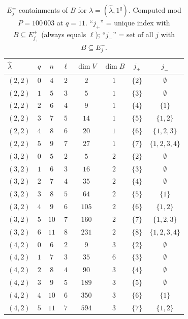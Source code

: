 \documentclass[11pt]{article}
\theoremstyle{definition}
\newcommand{\hatl}{\widehat\lambda}
\begin{document}
\begin{table}[h]
\centering
\renewcommand{\arraystretch}{1.15}
\caption{$E_j^\pm$ containments of $B$ for $\lambda = (\hatl, 1^q)$.
Computed mod $P = 100\,003$ at $q = 11$.  ``$j_+$'' = unique index with
$B \subseteq E_{j_+}^+$ (always equals $\ell$); ``$j_-$'' = set of all
$j$ with $B \subseteq E_j^-$.}
\label{tab:eigenspace-data}
\begin{tabular}{l|c|c|c|c|c|c|c}
\toprule
$\hatl$ & $q$ & $n$ & $\ell$ & $\dim V$ & $\dim B$ & $j_+$ & $j_-$ \\
\midrule
$(2, 2)$ & $0$ & $4$  & $2$ & $2$   & $1$ & $\{2\}$ & $\emptyset$ \\
$(2, 2)$ & $1$ & $5$  & $3$ & $5$   & $1$ & $\{3\}$ & $\emptyset$ \\
$(2, 2)$ & $2$ & $6$  & $4$ & $9$   & $1$ & $\{4\}$ & $\{1\}$ \\
$(2, 2)$ & $3$ & $7$  & $5$ & $14$  & $1$ & $\{5\}$ & $\{1, 2\}$ \\
$(2, 2)$ & $4$ & $8$  & $6$ & $20$  & $1$ & $\{6\}$ & $\{1, 2, 3\}$ \\
$(2, 2)$ & $5$ & $9$  & $7$ & $27$  & $1$ & $\{7\}$ & $\{1, 2, 3, 4\}$ \\
\midrule
$(3, 2)$ & $0$ & $5$  & $2$ & $5$   & $2$ & $\{2\}$ & $\emptyset$ \\
$(3, 2)$ & $1$ & $6$  & $3$ & $16$  & $2$ & $\{3\}$ & $\emptyset$ \\
$(3, 2)$ & $2$ & $7$  & $4$ & $35$  & $2$ & $\{4\}$ & $\emptyset$ \\
$(3, 2)$ & $3$ & $8$  & $5$ & $64$  & $2$ & $\{5\}$ & $\{1\}$ \\
$(3, 2)$ & $4$ & $9$  & $6$ & $105$ & $2$ & $\{6\}$ & $\{1, 2\}$ \\
$(3, 2)$ & $5$ & $10$ & $7$ & $160$ & $2$ & $\{7\}$ & $\{1, 2, 3\}$ \\
$(3, 2)$ & $6$ & $11$ & $8$ & $231$ & $2$ & $\{8\}$ & $\{1, 2, 3, 4\}$ \\
\midrule
$(4, 2)$ & $0$ & $6$  & $2$ & $9$   & $3$ & $\{2\}$ & $\emptyset$ \\
$(4, 2)$ & $1$ & $7$  & $3$ & $35$  & $6$ & $\{3\}$ & $\emptyset$ \\
$(4, 2)$ & $2$ & $8$  & $4$ & $90$  & $3$ & $\{4\}$ & $\emptyset$ \\
$(4, 2)$ & $3$ & $9$  & $5$ & $189$ & $3$ & $\{5\}$ & $\emptyset$ \\
$(4, 2)$ & $4$ & $10$ & $6$ & $350$ & $3$ & $\{6\}$ & $\{1\}$ \\
$(4, 2)$ & $5$ & $11$ & $7$ & $594$ & $3$ & $\{7\}$ & $\{1, 2\}$ \\

\end{tabular}
\end{table}
\end{document}
